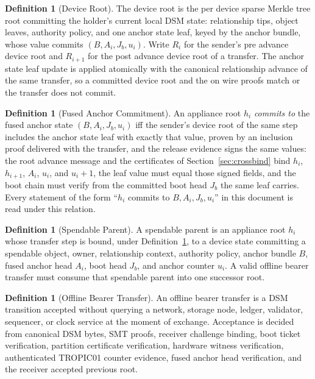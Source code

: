 \documentclass[11pt]{article}
\theoremstyle{definition}
\newtheorem{definition}[theorem]{Definition}
\theoremstyle{remark}
\newcommand{\Bundle}{\ensuremath{B}}
\newcommand{\Ahead}{\ensuremath{A}}
\newcommand{\Bhead}{\ensuremath{J}}
\begin{document}
\begin{definition}[Device Root]\label{def:devroot}
The device root is the per device sparse Merkle tree root committing the holder's current local
DSM state: relationship tips, object leaves, authority policy, and one anchor state leaf, keyed by
the anchor bundle, whose value commits \((\Bundle,\Ahead_i,\Bhead_b,u_i)\). Write \(R_i\) for the
sender's pre advance device root and \(R_{i+1}\) for the post advance device root of a transfer.
The anchor state leaf update is applied atomically with the canonical relationship advance of the
same transfer, so a committed device root and the on wire proofs match or the transfer does not
commit.
\end{definition}

\begin{definition}[Fused Anchor Commitment]\label{def:anchorcommit}
An appliance root \(h_i\) \emph{commits to} the fused anchor state
\((\Bundle,\Ahead_i,\Bhead_b,u_i)\) iff the sender's device root of the same step includes the
anchor state leaf with exactly that value, proven by an inclusion proof delivered with the
transfer, and the release evidence signs the same values: the root advance message and the
certificates of Section~\ref{sec:crossbind} bind \(h_i\), \(h_{i+1}\), \(\Ahead_i\), \(u_i\), and
\(u_i+1\), the leaf value must equal those signed fields, and the boot chain must verify from the
committed boot head \(\Bhead_b\) the same leaf carries. Every statement of the form ``\(h_i\)
commits to \(\Bundle,\Ahead_i,\Bhead_b,u_i\)'' in this document is read under this relation.
\end{definition}

\begin{definition}[Spendable Parent]
A spendable parent is an appliance root \(h_i\) whose transfer step is bound, under
Definition~\ref{def:anchorcommit}, to a device state committing a spendable object, owner,
relationship context, authority policy, anchor bundle \(\Bundle\), fused anchor head \(\Ahead_i\),
boot head \(\Bhead_b\), and anchor counter \(u_i\). A valid offline bearer transfer must consume
that spendable parent into one successor root.
\end{definition}

\begin{definition}[Offline Bearer Transfer]
An offline bearer transfer is a DSM transition accepted without querying a network, storage node,
ledger, validator, sequencer, or clock service at the moment of exchange. Acceptance is decided
from canonical DSM bytes, SMT proofs, receiver challenge binding, boot ticket verification,
partition certificate verification, hardware witness verification, authenticated TROPIC01 counter
evidence, fused anchor head verification, and the receiver accepted previous root.
\end{definition}
\end{document}
